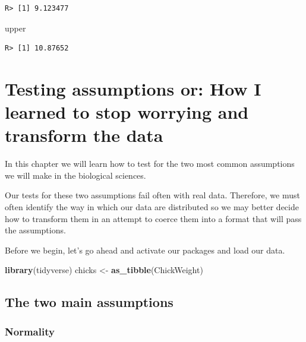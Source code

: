 \documentclass[english,10pt,a4paper,oneside]{book}
\newenvironment{Shaded}{\begin{snugshade}}{\end{snugshade}}
\newcommand{\KeywordTok}[1]{\textcolor[rgb]{0.13,0.29,0.53}{\textbf{#1}}}
\newcommand{\NormalTok}[1]{#1}
\newcommand{\StringTok}[1]{\textcolor[rgb]{0.31,0.60,0.02}{#1}}
\theoremstyle{definition}
\theoremstyle{definition}
\theoremstyle{definition}
\theoremstyle{remark}
\begin{document}
\begin{verbatim}
R> [1] 9.123477
\end{verbatim}

\begin{Shaded}
\begin{Highlighting}[]
\NormalTok{upper}
\end{Highlighting}
\end{Shaded}

\begin{verbatim}
R> [1] 10.87652
\end{verbatim}

\hypertarget{testing-assumptions-or-how-i-learned-to-stop-worrying-and-transform-the-data}{%
\chapter{Testing assumptions or: How I learned to stop worrying and
transform the
data}\label{testing-assumptions-or-how-i-learned-to-stop-worrying-and-transform-the-data}}

In this chapter we will learn how to test for the two most common
assumptions we will make in the biological sciences.

Our tests for these two assumptions fail often with real data.
Therefore, we must often identify the way in which our data are
distributed so we may better decide how to transform them in an attempt
to coerce them into a format that will pass the assumptions.

Before we begin, let's go ahead and activate our packages and load our
data.

\begin{Shaded}
\begin{Highlighting}[]
\KeywordTok{library}\NormalTok{(tidyverse)}
\NormalTok{chicks <-}\StringTok{ }\KeywordTok{as_tibble}\NormalTok{(ChickWeight)}
\end{Highlighting}
\end{Shaded}

\hypertarget{the-two-main-assumptions}{%
\section{The two main assumptions}\label{the-two-main-assumptions}}

\hypertarget{normality-1}{%
\subsection{Normality}\label{normality-1}}
\end{document}
